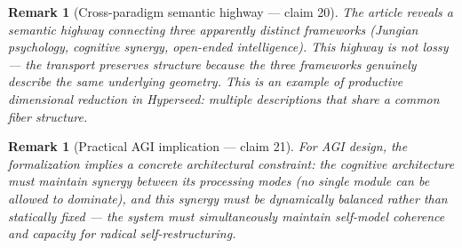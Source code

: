 \documentclass[11pt,a4paper]{article}
\newtheorem{remark}[definition]{Remark}
\begin{document}
\begin{remark}[Cross-paradigm semantic highway --- claim 20]
The article reveals a semantic highway connecting three apparently
distinct frameworks (Jungian psychology, cognitive synergy, open-ended
intelligence). This highway is \emph{not} lossy --- the transport
preserves structure because the three frameworks genuinely describe
the same underlying geometry. This is an example of productive
dimensional reduction in Hyperseed: multiple descriptions that share
a common fiber structure.
\end{remark}

\begin{remark}[Practical AGI implication --- claim 21]
For AGI design, the formalization implies a concrete architectural
constraint: the cognitive architecture must maintain synergy between
its processing modes (no single module can be allowed to dominate),
and this synergy must be dynamically balanced rather than statically
fixed --- the system must simultaneously maintain self-model coherence
and capacity for radical self-restructuring.
\end{remark}
\end{document}

